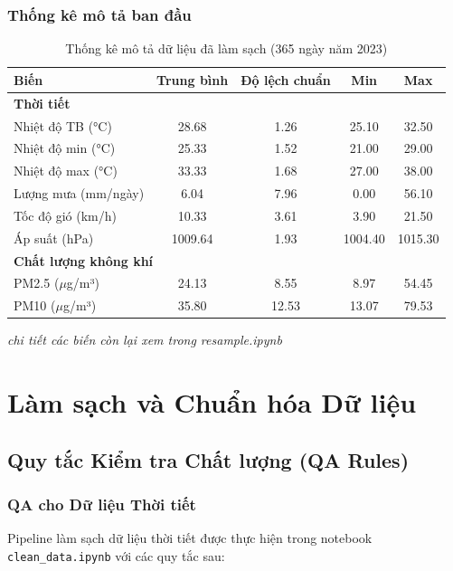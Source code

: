 \documentclass[12pt,a4paper]{article}
\begin{document}
\subsubsection{Thống kê mô tả ban đầu}
\begin{table}[H]
\centering
\small
\begin{tabular}{lcccc}
\toprule
\textbf{Biến} & \textbf{Trung bình} & \textbf{Độ lệch chuẩn} & \textbf{Min} & \textbf{Max} \\
\midrule
\multicolumn{5}{l}{\textbf{Thời tiết}} \\
Nhiệt độ TB (°C) & 28.68 & 1.26 & 25.10 & 32.50 \\
Nhiệt độ min (°C) & 25.33 & 1.52 & 21.00 & 29.00 \\
Nhiệt độ max (°C) & 33.33 & 1.68 & 27.00 & 38.00 \\
Lượng mưa (mm/ngày) & 6.04 & 7.96 & 0.00 & 56.10 \\
Tốc độ gió (km/h) & 10.33 & 3.61 & 3.90 & 21.50 \\
Áp suất (hPa) & 1009.64 & 1.93 & 1004.40 & 1015.30 \\
\midrule
\multicolumn{5}{l}{\textbf{Chất lượng không khí}} \\
PM2.5 ($\mu$g/m³) & 24.13 & 8.55 & 8.97 & 54.45 \\
PM10 ($\mu$g/m³) & 35.80 & 12.53 & 13.07 & 79.53 \\

\bottomrule
\end{tabular}
\caption{Thống kê mô tả dữ liệu đã làm sạch (365 ngày năm 2023)}
\end{table}

\textit{\small chi tiết các biến còn lại xem trong resample.ipynb}
\section{Làm sạch và Chuẩn hóa Dữ liệu}
\label{sec:qa}

\subsection{Quy tắc Kiểm tra Chất lượng (QA Rules)}

\subsubsection{QA cho Dữ liệu Thời tiết}
Pipeline làm sạch dữ liệu thời tiết được thực hiện trong notebook \texttt{clean\_data.ipynb} với các quy tắc sau:
\end{document}
